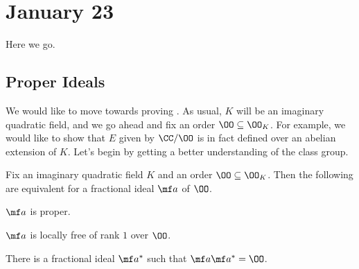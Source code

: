 \documentclass[../notes.tex]{subfiles}
\begin{document}
\section{January 23}

Here we go.

\subsection{Proper Ideals}
We would like to move towards proving . As usual, $K$ will be an imaginary quadratic field, and we go ahead and fix an order $\OO\subseteq\OO_K$. For example, we would like to show that $E$ given by $\CC/\OO$ is in fact defined over an abelian extension of $K$. Let's begin by getting a better understanding of the class group.
\begin{lemma} \label{lem:proper-ideal-order}
	Fix an imaginary quadratic field $K$ and an order $\OO\subseteq\OO_K$. Then the following are equivalent for a fractional ideal $\mf a$ of $\OO$.
	\begin{listalph}
		\item $\mf a$ is proper.
		\item $\mf a$ is locally free of rank $1$ over $\OO$.
		\item There is a fractional ideal $\mf a^*$ such that $\mf a\mf a^*=\OO$.
	\end{listalph}
\end{lemma}
\end{document}
